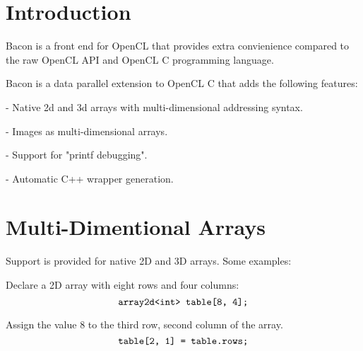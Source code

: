 \documentclass{article}
\begin{document}
\section{Introduction}

Bacon is a front end for OpenCL that provides extra convienience compared
to the raw OpenCL API and OpenCL C programming language.

Bacon is a data parallel extension to OpenCL C that adds the following
features:

 - Native 2d and 3d arrays with multi-dimensional addressing syntax.

 - Images as multi-dimensional arrays.

 - Support for "printf debugging".

 - Automatic C++ wrapper generation.

\section{Multi-Dimentional Arrays}

Support is provided for native 2D and 3D arrays. Some examples:

Declare a 2D array with eight rows and four columns:
$$\hbox{\tt array2d<int> table[8, 4];}$$

Assign the value 8 to the third row, second column of the array.
$$\hbox{\tt table[2, 1] = table.rows;}$$
\end{document}
